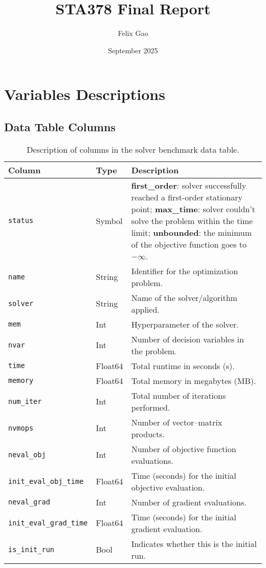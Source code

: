 \documentclass{article}
\title{STA378 Final Report}
\author{Felix Gao}
\date{September 2025}
\begin{document}
\maketitle

\section{Variables Descriptions}
\subsection*{Data Table Columns}

\begin{table}[H]
\centering
\begin{tabularx}{\textwidth}{|l|l|Y|}
\hline
\textbf{Column} & \textbf{Type} & \textbf{Description} \\
\hline
\texttt{status} & Symbol &
\textbf{first\_order}: solver successfully reached a first-order stationary point; 
\textbf{max\_time}: solver couldn't solve the problem within the time limit; 
\textbf{unbounded}: the minimum of the objective function goes to $-\infty$. \\
\hline
\texttt{name} & String & Identifier for the optimization problem. \\
\hline
\texttt{solver} & String & Name of the solver/algorithm applied. \\
\hline
\texttt{mem} & Int & Hyperparameter of the solver. \\
\hline
\texttt{nvar} & Int & Number of decision variables in the problem. \\
\hline
\texttt{time} & Float64 & Total runtime in seconds (s). \\
\hline
\texttt{memory} & Float64 & Total memory in megabytes (MB). \\
\hline
\texttt{num\_iter} & Int & Total number of iterations performed. \\
\hline
\texttt{nvmops} & Int & Number of vector–matrix products. \\
\hline
\texttt{neval\_obj} & Int & Number of objective function evaluations. \\
\hline
\texttt{init\_eval\_obj\_time} & Float64 & Time (seconds) for the initial objective evaluation. \\
\hline
\texttt{neval\_grad} & Int & Number of gradient evaluations. \\
\hline
\texttt{init\_eval\_grad\_time} & Float64 & Time (seconds) for the initial gradient evaluation. \\
\hline
\texttt{is\_init\_run} & Bool & Indicates whether this is the initial run. \\
\hline
\end{tabularx}
\caption{Description of columns in the solver benchmark data table.}
\end{table}

\section{}
\end{document}
